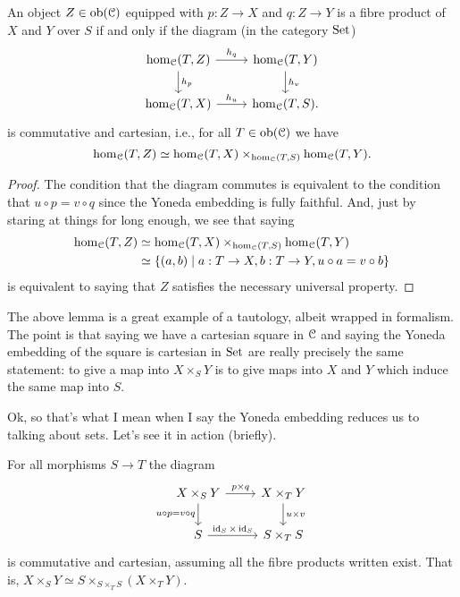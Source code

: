 \begin{lemma}
  \label{magic}
  An object $Z \in \operatorname{ob}(\mathcal{C})$ equipped with $p : Z \to X$ and $q : Z \to
  Y$ is a fibre product of $X$ and $Y$ over $S$ if and only if the
  diagram (in the category $\mathrm{Set}$)
  \[
  \begin{tikzcd}
    \hom_\C(T, Z) \rar{h_q} \dar{h_p} & \hom_\C(T, Y) \dar{h_v}
    \\ \hom_\C(T,X) \rar{h_u} & \hom_\C(T,S).
  \end{tikzcd}
  \]
  is commutative and cartesian, i.e., for all $T \in \operatorname{ob}(\mathcal{C})$ we have
  \[
  \operatorname{hom}_{\mathcal{C}}(T,Z) \simeq \operatorname{hom}_{\mathcal{C}}(T,X) \times_{\operatorname{hom}_{\mathcal{C}}(T,S)}
  \operatorname{hom}_{\mathcal{C}}(T,Y).
  \]
\end{lemma}

\begin{proof}
  The condition that the diagram commutes is equivalent to the
  condition that $u \circ p = v \circ q$ since the Yoneda embedding is
  fully faithful. And, just by staring at things for long enough, we
  see that saying
  \begin{align*}
  \operatorname{hom}_{\mathcal{C}}(T,Z) &\simeq \operatorname{hom}_{\mathcal{C}}(T,X) \times_{\operatorname{hom}_{\mathcal{C}}(T,S)} \operatorname{hom}_{\mathcal{C}}(T,Y)
  \\ &\simeq \{(a, b) \mid a : T \to X, b : T \to Y, u \circ a = v
  \circ b\}
  \end{align*}
  is equivalent to saying that $Z$ satisfies the necessary universal
  property.
\end{proof}

\begin{remark}
  The above lemma is a great example of a tautology, albeit wrapped in
  formalism. The point is that saying we have a cartesian square in
  $\mathcal{C}$ and saying the Yoneda embedding of the square is cartesian in
  $\mathrm{Set}$ are really precisely the same statement: to give a map into
  $X \times_S Y$ is to give maps into $X$ and $Y$ which induce the
  same map into $S$.
\end{remark}

Ok, so that's what I mean when I say the Yoneda embedding reduces us
to talking about sets. Let's see it in action (briefly).

\begin{lemma}
  For all morphisms $S \to T$ the diagram
  \[
  \begin{tikzcd}
    X \times_S Y \rar{p \times q} \ar{d}[left]{u \circ p = v \circ q}
    & X \times_T Y \dar{u \times v} \\ S \rar{\id_S \times \id_S} & S
    \times_T S
  \end{tikzcd}
  \]
  is commutative and cartesian, assuming all the fibre products
  written exist. That is, $X \times_S Y \simeq S \times_{S \times_T S}
  (X \times_T Y)$.
\end{lemma}

